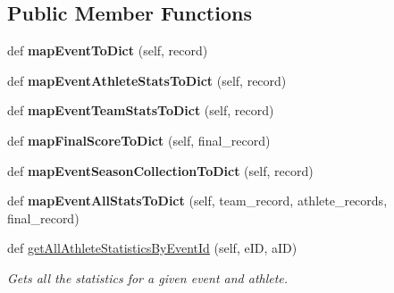 \subsection*{Public Member Functions}
\begin{DoxyCompactItemize}
\item 
\mbox{\label{classhandler_1_1event__result_1_1_event_result_handler_a5cad47e285caab987b507a8b22bb1907}} 
def {\bfseries map\+Event\+To\+Dict} (self, record)
\item 
\mbox{\label{classhandler_1_1event__result_1_1_event_result_handler_a6e58d54e7b0b45f8bde26d97151dfc58}} 
def {\bfseries map\+Event\+Athlete\+Stats\+To\+Dict} (self, record)
\item 
\mbox{\label{classhandler_1_1event__result_1_1_event_result_handler_a02af2f69a205466694c15f80d70a8b3d}} 
def {\bfseries map\+Event\+Team\+Stats\+To\+Dict} (self, record)
\item 
\mbox{\label{classhandler_1_1event__result_1_1_event_result_handler_a1cff4eb9aa6cf87f19eb4542b02cb6e7}} 
def {\bfseries map\+Final\+Score\+To\+Dict} (self, final\+\_\+record)
\item 
\mbox{\label{classhandler_1_1event__result_1_1_event_result_handler_a50c877cc066579d3dd95fd0b5993e09e}} 
def {\bfseries map\+Event\+Season\+Collection\+To\+Dict} (self, record)
\item 
\mbox{\label{classhandler_1_1event__result_1_1_event_result_handler_a91ce1e2792f100f49170a77bcf990af6}} 
def {\bfseries map\+Event\+All\+Stats\+To\+Dict} (self, team\+\_\+record, athlete\+\_\+records, final\+\_\+record)
\item 
def \hyperlink{classhandler_1_1event__result_1_1_event_result_handler_a9dd07bb5cbde7d150d9d37d2e558c46f}{get\+All\+Athlete\+Statistics\+By\+Event\+Id} (self, e\+ID, a\+ID)
\begin{DoxyCompactList}\small\item\em Gets all the statistics for a given event and athlete. \end{DoxyCompactList}\item 

\end{DoxyCompactItemize}

